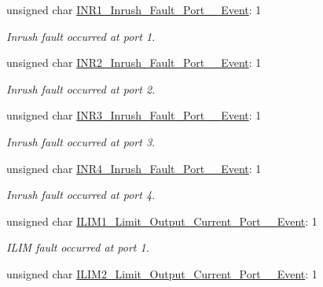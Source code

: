 \begin{DoxyCompactItemize}
\item 
unsigned char \hyperlink{struct_t_p_s238_x___inrush___i_l_i_m___event___register__t_a8cde8ccf9b1643b13c88ed7ed34773b3}{I\-N\-R1\-\_\-\-Inrush\-\_\-\-Fault\-\_\-\-Port\-\_\-\_\-\-Event}\-: 1
\begin{DoxyCompactList}\small\item\em Inrush fault occurred at port 1. \end{DoxyCompactList}\item 
unsigned char \hyperlink{struct_t_p_s238_x___inrush___i_l_i_m___event___register__t_a94c4d37935255dc16de9cf33e3654a7e}{I\-N\-R2\-\_\-\-Inrush\-\_\-\-Fault\-\_\-\-Port\-\_\-\_\-\-Event}\-: 1
\begin{DoxyCompactList}\small\item\em Inrush fault occurred at port 2. \end{DoxyCompactList}\item 
unsigned char \hyperlink{struct_t_p_s238_x___inrush___i_l_i_m___event___register__t_ac4fada19ba45f3760febeff734622be7}{I\-N\-R3\-\_\-\-Inrush\-\_\-\-Fault\-\_\-\-Port\-\_\-\_\-\-Event}\-: 1
\begin{DoxyCompactList}\small\item\em Inrush fault occurred at port 3. \end{DoxyCompactList}\item 
unsigned char \hyperlink{struct_t_p_s238_x___inrush___i_l_i_m___event___register__t_aa5849aefe6b84d6550b06ee3ce05f4fc}{I\-N\-R4\-\_\-\-Inrush\-\_\-\-Fault\-\_\-\-Port\-\_\-\_\-\-Event}\-: 1
\begin{DoxyCompactList}\small\item\em Inrush fault occurred at port 4. \end{DoxyCompactList}\item 
unsigned char \hyperlink{struct_t_p_s238_x___inrush___i_l_i_m___event___register__t_aa2bcf32772bcafe662455aaffee49a00}{I\-L\-I\-M1\-\_\-\-Limit\-\_\-\-Output\-\_\-\-Current\-\_\-\-Port\-\_\-\_\-\-Event}\-: 1
\begin{DoxyCompactList}\small\item\em I\-L\-I\-M fault occurred at port 1. \end{DoxyCompactList}\item 
unsigned char \hyperlink{struct_t_p_s238_x___inrush___i_l_i_m___event___register__t_ae417ee0ed8cf4847a85204a278e14223}{I\-L\-I\-M2\-\_\-\-Limit\-\_\-\-Output\-\_\-\-Current\-\_\-\-Port\-\_\-\_\-\-Event}\-: 1

\end{DoxyCompactItemize}
